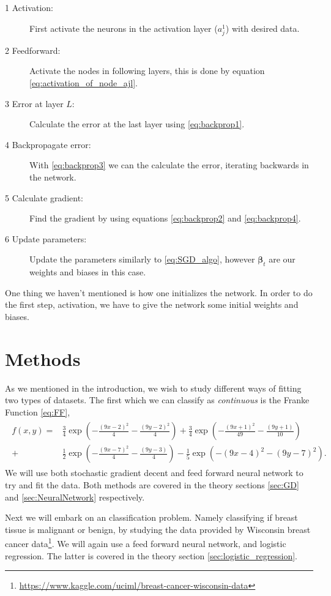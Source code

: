 \documentclass[12pt]{extarticle}
\begin{document}
\begin{description}
	\item[1 Activation:] First activate the neurons in the activation layer ($a^1_j$) with desired data.
	\item[2 Feedforward:] Activate the nodes in following layers, this is done by equation \eqref{eq:activation_of_node_ajl}.
	\item[3 Error at layer $L$:] Calculate the error at the last layer using \eqref{eq:backprop1}.
	\item[4 Backpropagate error:] With \eqref{eq:backprop3} we can the calculate the error, iterating backwards in the network.
	\item[5 Calculate gradient:] Find the gradient by using equations \eqref{eq:backprop2} and \eqref{eq:backprop4}.
	\item[6 Update parameters:] Update the parameters similarly to \eqref{eq:SGD_algo}, however $\boldsymbol{\beta}_t$ are our weights and biases in this case.
\end{description}
One thing we haven't mentioned is how one initializes the network. In order to do the first step, activation, we have to give the network some initial weights and biases. 

\section{Methods}
As we mentioned in the introduction, we wish to study different ways of fitting two types of datasets. The first which we can classify as \textit{continuous} is the Franke Function \eqref{eq:FF},
\begin{align}
\begin{split}\label{eq:FF}
f(x,y) = &\frac{3}{4}\exp(-\frac{(9x -2)^2}{4} - \frac{(9y-2)^2}{4}) + \frac{3}{4}\exp(-\frac{(9x + 1)^2}{49} - \frac{(9y + 1)}{10})
\\
+ &\frac{1}{2}\exp(-\frac{(9x-7)^2}{4} - \frac{(9y -3)}{4}) - \frac{1}{5}\exp(-(9x-4)^2 - (9y-7)^2).
\end{split}
\end{align}
We will use both stochastic gradient decent and feed forward neural network to try and fit the data. Both methods are covered in the theory sections \ref{sec:GD} and \ref{sec:NeuralNetwork} respectively.

Next we will embark on an classification problem. Namely classifying if breast tissue is malignant or benign, by studying the data provided by Wisconsin breast cancer data\footnote{\href{https://www.kaggle.com/uciml/breast-cancer-wisconsin-data}{https://www.kaggle.com/uciml/breast-cancer-wisconsin-data}}. We will again use a feed forward neural network, and logistic regression. The latter is covered in the theory section \ref{sec:logistic_regression}.
\end{document}
